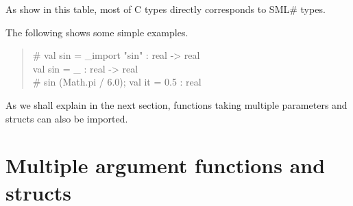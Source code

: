 \documentclass{jbook}
\newcommand{\txt}[2]{#2}
\newcommand{\smlsharp}{SML\#}
\newenvironment{program}{\begin{tt}\begin{quote}}{\end{quote}\end{tt}}
\begin{document}
	As show in this table, most of C types directly corresponds to
\smlsharp{} types.

	The following shows some simple examples.
\begin{program}
\# val sin = \_import "sin" : real -> real\\
val sin = \_ : real -> real\\
\# sin (Math.pi / 6.0);
val it = 0.5 : real
\end{program}
	As we shall explain in the next section,
functions taking multiple parameters and structs can also be imported.
\fi%

\section{
\txt{複数引数関数と構造体}
    {Multiple argument functions and structs}
}
\label{sec:extensionStructFunction}
\end{document}
